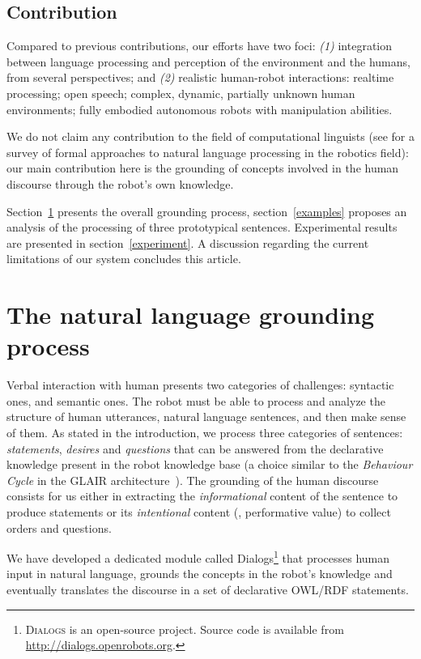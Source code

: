 \subsection{Contribution}

Compared to previous contributions, our efforts have two foci: {\it (1)}
integration between language processing and perception of the environment and
the humans, from several perspectives; and {\it (2)} realistic human-robot interactions:
realtime processing; open speech; complex, dynamic, partially unknown human environments; fully
embodied autonomous robots with manipulation abilities. 

We do not claim any contribution to the field of computational linguists (see
\cite{Kruijff2010} for a survey of formal approaches to natural language
processing in the robotics field): our main contribution here is the grounding
of concepts involved in the human discourse through the robot's own knowledge.

Section~\ref{dialog} presents the overall grounding process, section~\ref{examples} 
proposes an analysis of the processing of three prototypical sentences. 
Experimental results are presented in section~\ref{experiment}. A 
discussion regarding the current limitations of our system concludes
this article.

\section{The natural language grounding process}
\label{dialog}

Verbal interaction with human presents two categories of challenges: syntactic
ones, and semantic ones. The robot must be able to process and analyze the
structure of human utterances, \ie natural language sentences, and then make
sense of them. As stated in the introduction, we process three categories of
sentences: \emph{statements}, \emph{desires} and \emph{questions} that can be
answered from the declarative knowledge present in the robot knowledge base (a
choice similar to the \emph{Behaviour Cycle} in the GLAIR
architecture~\cite{Shapiro2009}). The grounding of the human discourse consists
for us either in extracting the \emph{informational} content of the sentence
to produce statements or its \emph{intentional} content (\ie, performative value)
to collect orders and questions.

We have developed a dedicated module called {\sc
Dialogs}\footnote{\textsc{Dialogs} is an open-source project. Source code is
available from \url{http://dialogs.openrobots.org}.} that processes human
input in natural language, grounds the concepts in the robot's knowledge and
eventually translates the discourse in a set of declarative OWL/RDF statements.

